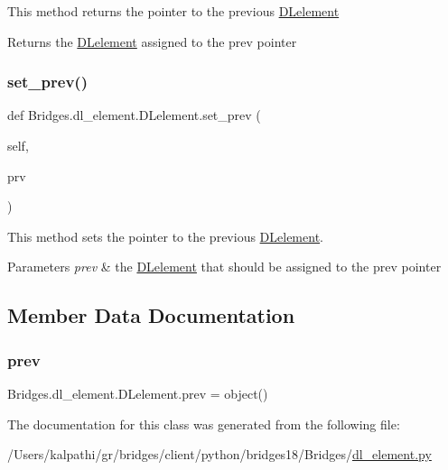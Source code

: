 This method returns the pointer to the previous \mbox{\hyperlink{class_bridges_1_1dl__element_1_1_d_lelement}{D\+Lelement}}

\begin{DoxyReturn}{Returns}
the \mbox{\hyperlink{class_bridges_1_1dl__element_1_1_d_lelement}{D\+Lelement}} assigned to the prev pointer 
\end{DoxyReturn}
\mbox{\label{class_bridges_1_1dl__element_1_1_d_lelement_a5a1281ba8e5d39551f6b0628b28cdda2}} 
\subsubsection{\texorpdfstring{set\+\_\+prev()}{set\_prev()}}
{\footnotesize\ttfamily def Bridges.\+dl\+\_\+element.\+D\+Lelement.\+set\+\_\+prev (\begin{DoxyParamCaption}\item[{}]{self,  }\item[{}]{prv }\end{DoxyParamCaption})}



This method sets the pointer to the previous \mbox{\hyperlink{class_bridges_1_1dl__element_1_1_d_lelement}{D\+Lelement}}. 


\begin{DoxyParams}{Parameters}
{\em prev} & the \mbox{\hyperlink{class_bridges_1_1dl__element_1_1_d_lelement}{D\+Lelement}} that should be assigned to the prev pointer \\
\hline
\end{DoxyParams}


\subsection{Member Data Documentation}
\mbox{\label{class_bridges_1_1dl__element_1_1_d_lelement_a5098c0244f6c4512db45f494266baf8a}} 
\subsubsection{\texorpdfstring{prev}{prev}}
{\footnotesize\ttfamily Bridges.\+dl\+\_\+element.\+D\+Lelement.\+prev = object()\hspace{0.3cm}{\ttfamily [static]}}



The documentation for this class was generated from the following file\+:\begin{DoxyCompactItemize}
\item 
/\+Users/kalpathi/gr/bridges/client/python/bridges18/\+Bridges/\mbox{\hyperlink{dl__element_8py}{dl\+\_\+element.\+py}}\end{DoxyCompactItemize}
